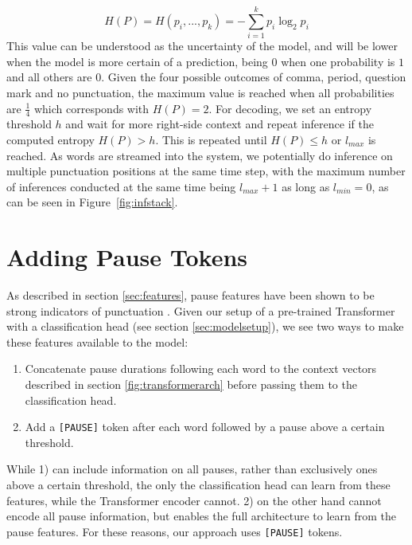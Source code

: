 \documentclass[bsc,deptreport,ai]{infthesis} %
\begin{document}
$$H(P)=H(p_i,...,p_k)=-\sum_{i=1}^k p_i \log_2 p_i$$
This value can be understood as the uncertainty of the model, and will be lower when the model is more certain of a prediction, being $0$ when one probability is $1$ and all others are $0$. Given the four possible outcomes of comma, period, question mark and no punctuation, the maximum value is reached when all probabilities are $\frac{1}{4}$ which corresponds with $H(P)=2$. For decoding, we set an entropy threshold $h$ and wait for more right-side context and repeat inference if the computed entropy $H(P)>h$. This is repeated until $H(P)\leq h$ or $l_{max}$ is reached. As words are streamed into the system, we potentially do inference on multiple punctuation positions at the same time step, with the maximum number of inferences conducted at the same time being $l_{max}+1$ as long as $l_{min}=0$, as can be seen in Figure~\ref{fig:infstack}.

\section{Adding Pause Tokens}
\label{sec:pausetok}

As described in section \ref{sec:features}, pause features have been shown to be strong indicators of punctuation \citep{christensen2001}. Given our setup of a pre-trained Transformer with a classification head (see section \ref{sec:modelsetup}), we see two ways to make these features available to the model:
\begin{enumerate}
    \item Concatenate pause durations following each word to the context vectors described in section \ref{fig:transformerarch} before passing them to the classification head.
    \item Add a \texttt{[PAUSE]} token after each word followed by a pause above a certain threshold.
\end{enumerate}
While 1) can include information on all pauses, rather than exclusively ones above a certain threshold, the only the classification head can learn from these features, while the Transformer encoder cannot. 2) on the other hand cannot encode all pause information, but enables the full architecture to learn from the pause features. For these reasons, our approach uses \texttt{[PAUSE]} tokens.
\end{document}
